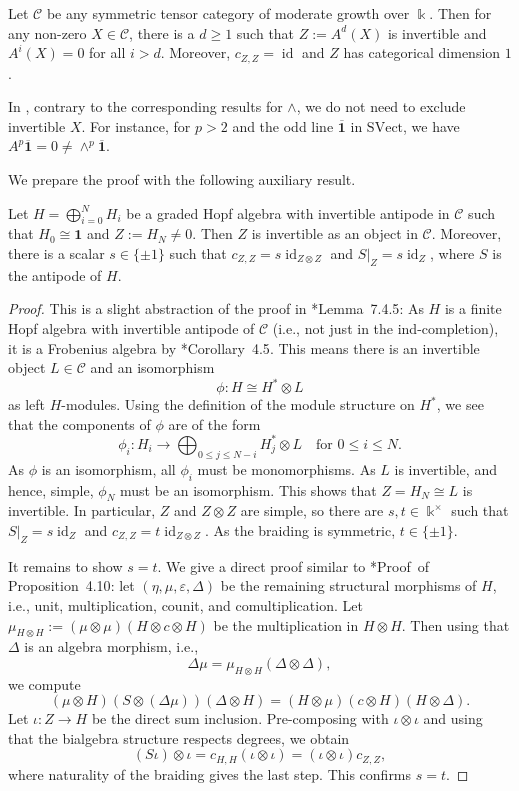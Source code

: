 \documentclass[11pt,oneside]{amsart}
\theoremstyle{definition}
\theoremstyle{remark}
\numberwithin{equation}{section}
\newcommand\cC{\mathcal C}
\newcommand\SVect{\mathrm{SVect}}
\renewcommand\o\otimes
\renewcommand\:\colon
\newcommand\ol{\overline}
\newcommand\one{\mathbf{1}}
\newcommand\kk{\Bbbk}
\newcommand\id{\operatorname{id}}
\begin{document}
\begin{proposition} \label{prop:alternating} Let $\cC$ be any symmetric tensor category of moderate growth over $\kk$. Then for any non-zero $X\in\cC$, there is a $d\ge1$ such that $Z:=A^d(X)$ is invertible and $A^i(X)=0$ for all $i>d$. Moreover, $c_{Z,Z}=\id$ and $Z$ has categorical dimension $1$.
\end{proposition}


\begin{remark}
    In , contrary to the corresponding results for $\wedge$, we do not need to exclude invertible $X$. For instance, for $p>2$ and the odd line $\ol{\one}$ in $\SVect$, we have $A^p\ol{\one}=0\not=\wedge^p \ol{\one}$.
\end{remark}

We prepare the proof with the following auxiliary result.

\begin{lemma} \label{lem:Hopf-algebra} Let $H=\bigoplus_{i=0}^N H_i$ be a graded Hopf algebra with invertible antipode in $\cC$ such that $H_0\cong\one$ and $Z:=H_N\neq0$. Then $Z$ is invertible as an object in $\cC$. Moreover, there is a scalar $s\in\{\pm 1\}$ such that $c_{Z,Z}=s \id_{Z\o Z}$ and $S|_Z=s \id_Z$, where $S$ is the antipode of $H$.
\end{lemma}

\begin{proof} This is a slight abstraction of the proof in \cite{CEO-incompressible}*{Lemma~7.4.5}: As $H$ is a finite Hopf algebra with invertible antipode of $\cC$ (i.e., not just in the ind-completion), it is a Frobenius algebra by \cite{Tak}*{Corollary~4.5}. This means there is an invertible object $L\in\cC$ and an isomorphism 
$$
\phi\: H\cong H^* \o L
$$
as left $H$-modules. Using the definition of the module structure on $H^*$, we see that the components of $\phi$ are of the form
$$
\phi_i\: H_i \to \bigoplus_{0\le j\le N-i} H_j^* \o L \quad 
\text{for } 0\le i\le N.
$$
As $\phi$ is an isomorphism, all $\phi_i$ must be monomorphisms. As $L$ is invertible, and hence, simple, $\phi_N$ must be an isomorphism. This shows that $Z=H_N\cong L$ is invertible. In particular, $Z$ and $Z\o Z$ are simple, so there are $s,t\in\kk^\times$ such that $S|_Z=s \id_Z$ and $c_{Z,Z}=t \id_{Z\o Z}$. As the braiding is symmetric, $t\in\{\pm1\}$.

It remains to show $s=t$. We give a direct proof similar to \cite{BKLT}*{Proof~of~ Proposition~4.10}: let $(\eta,\mu,\varepsilon,\Delta)$ be the remaining structural morphisms of $H$, i.e., unit, multiplication, counit, and comultiplication. Let $\mu_{H\o H}:=(\mu\o\mu)(H\o c\o H)$ be the multiplication in $H\o H$. Then using that $\Delta$ is an algebra morphism, i.e.,
$$
\Delta\mu = \mu_{H\o H}(\Delta\o\Delta) ,
$$
we compute
$$
(\mu\o H) (S\o (\Delta\mu)) (\Delta\o H)
= (H\o \mu) (c\o H) (H\o \Delta) .
$$
Let $\iota\:Z\to H$ be the direct sum inclusion. Pre-composing with $\iota\o\iota$ and using that the bialgebra structure respects degrees, we obtain
$$
(S\iota)\o\iota = c_{H,H}(\iota\o\iota) = (\iota\o\iota) c_{Z,Z} , 
$$
where naturality of the braiding gives the last step. This confirms $s=t$.
\end{proof}
\end{document}
